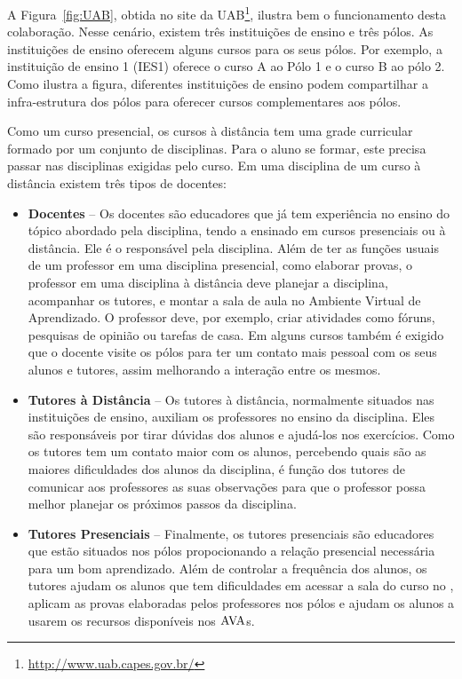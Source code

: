 A Figura~\ref{fig:UAB}, obtida no site da UAB\footnote{\url{http://www.uab.capes.gov.br/}}, 
ilustra bem o funcionamento desta colabora{\c c}{\~ a}o. Nesse cen{\' a}rio, existem três institui{\c c}{\~ o}es
de ensino e três p\'olos. As institui{\c c}{\~ o}es de ensino oferecem alguns cursos para os seus 
p\'olos. Por exemplo, a institui{\c c}{\~ a}o de ensino 1 (IES1) oferece o curso A ao P\'olo 1 e 
o curso B ao p\'olo 2. Como ilustra a figura, diferentes institui{\c c}{\~ o}es de ensino podem
compartilhar a infra-estrutura dos p\'olos para oferecer cursos complementares aos p\'olos.

Como um curso presencial, os cursos {\`a} dist{\^ a}ncia tem uma grade curricular formado 
por um conjunto de disciplinas. Para o aluno se formar, este precisa passar nas disciplinas
exigidas pelo curso. Em uma disciplina de um curso {\`a} dist{\^ a}ncia existem três tipos de docentes:
\begin{itemize}
 \item \textbf{Docentes} -- Os docentes s{\~ a}o educadores que j{\' a} tem experiência no ensino do t\'opico 
 abordado pela disciplina, tendo a ensinado em cursos presenciais ou {\`a} dist{\^ a}ncia. Ele {\'e} o respons{\' a}vel 
 pela disciplina. Al{\'e}m de ter as fun{\c c}{\~ o}es usuais de um professor em uma disciplina presencial, como 
 elaborar provas, 
 o professor em uma disciplina {\`a} dist{\^ a}ncia deve planejar a disciplina, acompanhar os tutores, e montar a sala de aula 
 no Ambiente Virtual de Aprendizado. O professor deve, por exemplo, criar
atividades como f\'oruns, pesquisas de opini{\~ a}o ou tarefas de casa.
 Em alguns cursos tamb{\'e}m {\'e} exigido que o docente visite os p\'olos para ter um contato mais pessoal 
 com os seus alunos e tutores, assim melhorando a intera{\c c}{\~ a}o entre os mesmos.
 
 \item \textbf{Tutores {\`a} Dist{\^ a}ncia} -- Os tutores {\`a} dist{\^ a}ncia, normalmente situados nas institui{\c c}{\~ o}es de ensino, 
 auxiliam os professores no ensino da disciplina. Eles s{\~ a}o respons{\' a}veis por tirar d{\' u}vidas dos alunos e ajud{\' a}-los 
 nos exerc{\' i}cios. Como os tutores tem um contato maior com os alunos, percebendo quais s{\~ a}o as maiores 
 dificuldades dos alunos da disciplina, {\'e} fun{\c c}{\~ a}o dos tutores de comunicar aos professores as suas observa{\c c}{\~ o}es para
 que o professor possa melhor planejar os pr\'oximos passos da disciplina. 
 
 
 \item \textbf{Tutores Presenciais} -- Finalmente, os tutores presenciais s{\~ a}o educadores que est{\~ a}o situados nos p\'olos
 propocionando a rela{\c c}{\~ a}o presencial necess{\' a}ria para um bom aprendizado. 
Al{\'e}m de controlar a frequência dos alunos, os tutores  ajudam os alunos que tem
dificuldades em acessar a sala do curso no 
 \ava, aplicam as provas elaboradas pelos professores nos p\'olos e 
 ajudam os alunos a usarem os recursos dispon{\' i}veis nos $\hbox{AVA}$s. 
\end{itemize}

